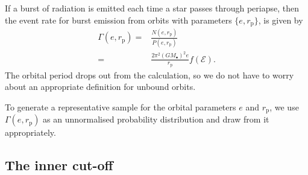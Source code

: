 \documentclass[useAMS,usedcolumn,usegraphicx,usenatbib]{mn2e}
\newcommand{\sub}[1]{\ensuremath{_\mathrm{#1}}}
\newcommand{\dd}{\ensuremath{\mathrm{d}}}
\begin{document}
If a burst of radiation is emitted each time a star passes through periapse, then the event rate for burst emission from orbits with parameters $\{e, r\sub{p}\}$, is given by
\begin{align}
\Gamma(e, r\sub{p}) = {} & \frac{N(e, r\sub{p})}{P(e, r\sub{p})}\\
 = {} & \frac{2\pi^2(GM_\bullet)^2 e}{r\sub{p}}f(\mathcal{E}).
\label{eq:Gamma}
\end{align}
The orbital period drops out from the calculation, so we do not have to worry about an appropriate definition for unbound orbits.



To generate a representative sample for the orbital parameters $e$ and $r\sub{p}$, we use $\Gamma(e, r\sub{p})$ as an unnormalised probability distribution and draw from it appropriately.

\subsection{The inner cut-off}
\end{document}
